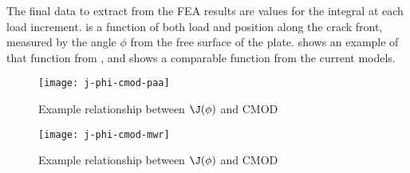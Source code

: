 The final data to extract from the FEA results are values for the \J integral at each load increment. \J is a function of both load and position along the crack front, measured by the angle \(\phi\) from the free surface of the plate.  shows an example of that function from \cite{allenwells2014}, and  shows a comparable function from the current models.

\begin{frame}
\begin{figure}[tbp]
\centering
\texttt{[image: j-phi-cmod-paa]}
\caption{\label{fig:j-phi-cmod-paa} Example relationship between \(\J(\phi)\) and CMOD \citep{allenwells2014}}
\end{figure}
\end{frame}

\begin{frame}
\begin{figure}[tbp]
\centering
\texttt{[image: j-phi-cmod-mwr]}
\caption{\label{fig:j-phi-cmod-mwr} Example relationship between \(\J(\phi)\) and CMOD}
\end{figure}
\end{frame}

%  
%  
